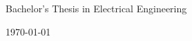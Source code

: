 \documentclass[../main.tex]{subfiles}
\begin{document}

\begin{titlepage}
    
    {\Large Bachelor's Thesis in Electrical Engineering}
    \vfill

    {\Large \today\par} %
\end{titlepage}
\end{document}

